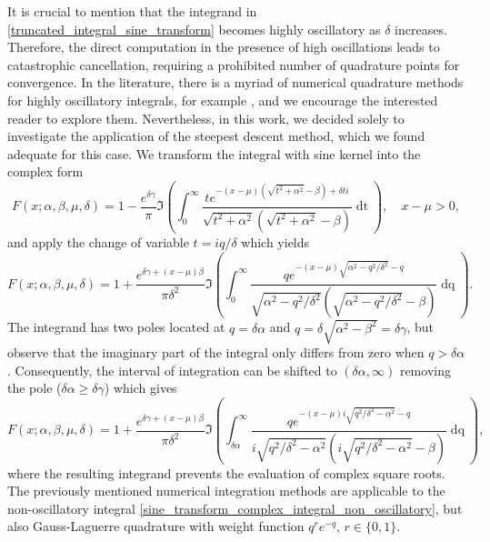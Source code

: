 \documentclass[10pt,a4paper,oneside]{article}
\numberwithin{equation}{section}
\begin{document}
It is crucial to mention that the integrand in \eqref{truncated_integral_sine_transform} becomes highly oscillatory as $\delta$ increases. Therefore, the direct computation in the presence of high oscillations leads to catastrophic cancellation, requiring a prohibited number of quadrature points for convergence. In the literature, there is a myriad of numerical quadrature methods for highly oscillatory integrals, for example \cite{Ooura1991}, and we encourage the interested reader to explore them.  Nevertheless,  in this work, we decided solely to investigate the application of the steepest descent method, which we found adequate for this case. We transform the integral with sine kernel into the complex form
\begin{equation}\label{sine_transform_complex_integral}
F(x; \alpha, \beta, \mu, \delta) = 1 - \frac{e^{\delta \gamma}}{\pi}\Im\left(\int_0^{\infty} \frac{t e^{-(x-\mu)\left(\sqrt{t^2 + \alpha^2} - \beta\right) + \delta t i}}{\sqrt{t^2 + \alpha^2}\left(\sqrt{t^2 + \alpha^2} - \beta\right)}\mathop{dt}\right), \quad x-\mu > 0,
\end{equation}
and apply the change of variable $t = i q / \delta$ which yields
\begin{equation}
F(x; \alpha, \beta, \mu, \delta) = 1 + \frac{e^{\delta \gamma + (x-\mu) \beta}}{\pi \delta^2} \Im\left(\int_{0}^{\infty} \frac{q e^{-(x-\mu)\sqrt{\alpha^2 - q^2/\delta^2} - q}}{\sqrt{\alpha^2 - q^2/\delta^2}\left(\sqrt{\alpha^2 - q^2/\delta^2} -\beta\right)} \mathop{dq}\right).
\end{equation}
The integrand has two poles located at $q = \delta \alpha$ and $q = \delta\sqrt{\alpha^2 - \beta^2} = \delta \gamma$, but observe that the imaginary part of the integral only differs from zero when $q > \delta \alpha$. Consequently, the interval of integration can be shifted to $(\delta \alpha, \infty)$ removing the pole ($\delta \alpha \ge \delta \gamma$) which gives
\begin{equation}\label{sine_transform_complex_integral_non_oscillatory}
F(x; \alpha, \beta, \mu, \delta) = 1 + \frac{e^{\delta \gamma + (x-\mu) \beta}}{\pi \delta^2} \Im\left(\int_{\delta\alpha}^{\infty} \frac{q e^{-(x-\mu)i\sqrt{q^2/\delta^2 - \alpha^2} - q}}{i\sqrt{q^2/\delta^2 - \alpha^2}\left(i\sqrt{q^2/\delta^2 - \alpha^2} -\beta\right)} \mathop{dq}\right),
\end{equation}
where the resulting integrand prevents the evaluation of complex square roots. The previously mentioned numerical integration methods are applicable to the non-oscillatory integral \eqref{sine_transform_complex_integral_non_oscillatory}, but also Gauss-Laguerre quadrature with weight function $q^r e^{-q}$, $r \in \{0, 1\}$.
\end{document}
